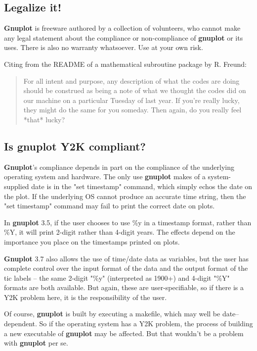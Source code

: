\documentclass[a4paper,11pt]{article}
\newcommand{\gnuplot}{\textbf{gnuplot}}
\newcommand{\Gnuplot}{\textbf{Gnuplot}}
\begin{document}
\subsection{Legalize it!}

\Gnuplot{} is freeware authored by a collection of volunteers, who cannot
make any legal statement about the compliance or non-compliance of
\gnuplot{} or its uses. There is also no warranty whatsoever. Use at your
own risk.


Citing from the README of a mathematical subroutine package by R.
Freund:

\begin{quote}
For all intent and purpose, any description of what the codes are doing
should be construed as being a note of what we thought the codes did on
our machine on a particular Tuesday of last year.  If you're really
lucky, they might do the same for you someday.  Then again, do you
really feel *that* lucky?
\end{quote}

\subsection{Is \gnuplot{} Y2K compliant?}

\Gnuplot's compliance depends in part on the compliance of the underlying
operating system and hardware.  The only use \gnuplot{} makes of a system-
supplied date is in the "set timestamp" command, which simply echos the
date on the plot.  If the underlying OS cannot produce an accurate time
string, then the "set timestamp" command may fail to print the correct
date on plots.

In \gnuplot{} 3.5, if the user chooses to use \%y in a timestamp format,
rather than \%Y, it will print 2-digit rather than 4-digit years.  The
effects depend on the importance you place on the timestamps printed on
plots.

\Gnuplot{} 3.7 also allows the use of time/date data as variables, but the
user has complete control over the input format of the data and the
output format of the tic labels -- the same 2-digit "\%y" (interpreted
as 1900+) and 4-digit "\%Y" formats are both available.  But again,
these are user-specifiable, so if there is a Y2K problem here, it is the
responsibility of the user.

Of course, \gnuplot{} is built by executing a makefile, which may well be
date--dependent.  So if the operating system has a Y2K problem, the
process of building a new executable of \gnuplot{} may be affected.  But
that wouldn't be a problem with \gnuplot{} per se.
\end{document}
